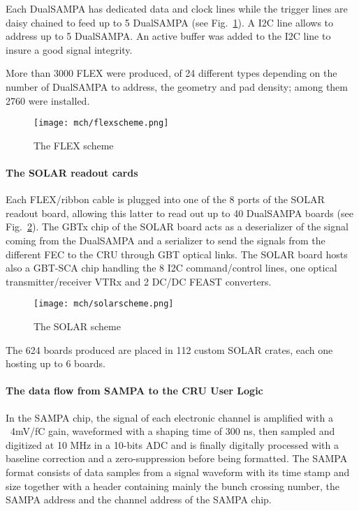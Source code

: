 Each DualSAMPA has dedicated data and clock lines while the
trigger lines are daisy chained to feed up to 5 DualSAMPA (see
Fig.~\ref{flexscheme}). A I2C line allows to address up to 5
DualSAMPA. An active buffer was added to the I2C line to insure a
good signal integrity.

More than 3000 FLEX were produced, of 24 different types depending on the number of DualSAMPA
to address, the geometry and pad density; among them 2760 were
installed.
 
\begin{figure}[h]
  \centering
  \texttt{[image: mch/flexscheme.png]}
     \caption[FLEX scheme]{ The FLEX scheme}
  \label{flexscheme}
\end{figure}



\paragraph{The SOLAR readout cards\\}
Each FLEX/ribbon cable is plugged into one of the 8 ports of the SOLAR readout
board, allowing this latter to read out up to 40 DualSAMPA boards (see
Fig.~\ref{solarscheme}). The GBTx chip of the SOLAR
board acts as a deserializer of the  signal coming from the DualSAMPA
and a serializer to send the signals from the different FEC to the CRU through GBT optical
links. The SOLAR board hosts also a GBT-SCA chip handling the 8 I2C
command/control lines, one optical transmitter/receiver VTRx and 2
DC/DC FEAST converters. 
 
\begin{figure}[h]
  \centering
  \texttt{[image: mch/solarscheme.png]}
     \caption[SOLAR scheme]{ The SOLAR scheme}
  \label{solarscheme}
\end{figure}

The 624 boards produced are placed in 112 custom SOLAR crates, each
one hosting up to 6 boards.


\paragraph{The data flow from SAMPA to the CRU User Logic\\}
In the SAMPA chip, the signal of each electronic channel is amplified with a ~4mV/fC gain,
waveformed with a shaping time of 300 ns, then sampled and digitized at 10 MHz in
a 10-bits ADC and is finally digitally processed with a baseline
correction and a zero-suppression before being formatted. The SAMPA format
consists of data samples from a signal waveform with its time stamp and
size together with a header containing mainly the bunch crossing number, the SAMPA
address and the channel address of the SAMPA chip.


